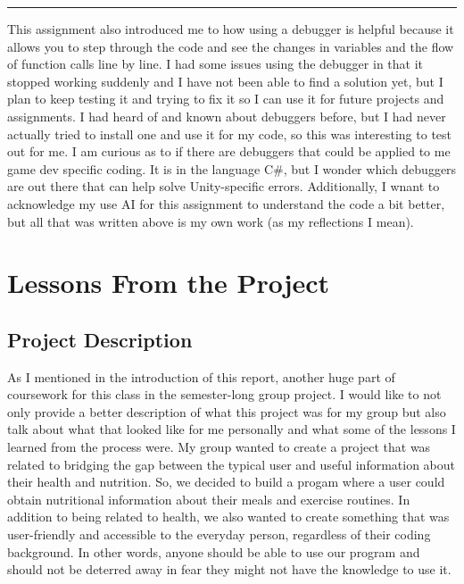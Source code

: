 \documentclass{article}
\theoremstyle{theorem}
\theoremstyle{definition}
\theoremstyle{remark}
\begin{document}
\noindent
{\color{gray} \rule{\linewidth}{0.05mm}}



This assignment also introduced me to how using a debugger is helpful because it allows you to step through the code and see the changes in variables and the flow of function calls line by line. I had some issues using the debugger in that it stopped working suddenly and I have not been able to find a solution yet, but I plan to keep 
testing it and trying to fix it so I can use it for future projects and assignments. I had heard of and known about debuggers before, but I had never actually tried to install one and use it for my code, so this was interesting to test out for me. I am curious as to if there are debuggers that could be applied to me game dev specific coding.
It is in the language C\#, but I wonder which debuggers are out there that can help solve Unity-specific errors. Additionally, I wnant to acknowledge my use AI for this assignment to understand the code a bit better, but all that was written above is my own work (as my reflections I mean). 


\section{Lessons From the Project}\label{Lessons From the Project}


\subsection{Project Description} 

As I mentioned in the introduction of this report, another huge part of coursework for this class in the semester-long group project. I would like to not only provide a better description of what this project was for my group but also talk about what that looked like for me 
personally and what some of the lessons I learned from the process were. My group wanted to create a project that was related to bridging the gap between the typical user and useful information about their health and nutrition. So, we decided to build a progam where a user could 
obtain nutritional information about their meals and exercise routines. In addition to being related to health, we also wanted to create something that was user-friendly and accessible to the everyday person, regardless of their coding background. In other words, anyone should be able 
to use our program and should not be deterred away in fear they might not have the knowledge to use it. \\
\end{document}
